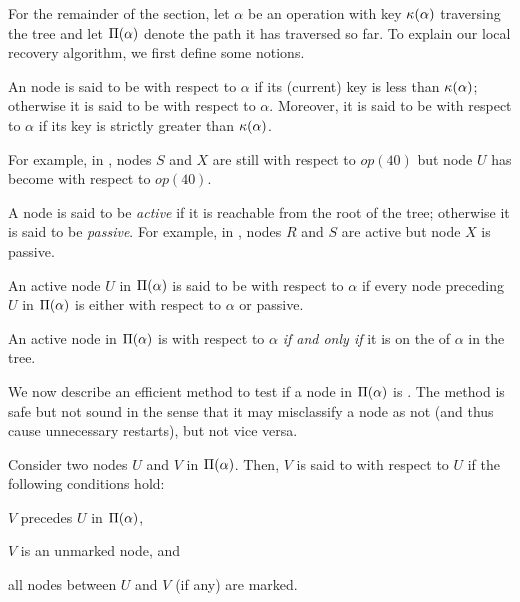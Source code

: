 For the remainder of the section, let $\alpha$ be an operation with key 
$\kappa(\alpha)$ traversing the tree and let $\Pi(\alpha)$ denote the 
path it has traversed so far. To explain our local recovery algorithm, we first define some notions.

\begin{definition}
An \myanchor{} node is said to be \emph{\myconsistent} with respect to $\alpha$ 
if its (current) key is less than $\kappa(\alpha)$; otherwise it is said to be \emph{\mynonconsistent} with respect to $\alpha$.
Moreover, it is said to be \emph{\myinconsistent} with respect to $\alpha$
if its key is strictly greater than $\kappa(\alpha)$.
\end{definition}


For example, in , \myanchor{} 
nodes $S$ and $X$ are still \myconsistent{} with respect to $op(40)$ but 
node $U$ has become \mynonconsistent{} with respect to $op(40)$. 


A node is said to be \emph{active} if it is reachable from the root of the tree; otherwise it is said to be \emph{passive}.
For example, in , nodes $R$ and $S$ are active but node $X$ is passive.

\begin{definition}
\label{def:legal}
An active node $U$ in $\Pi(\alpha)$ is said to be \emph{\mylegal} with respect to $\alpha$ 
if every \myanchor{} node preceding $U$ in $\Pi(\alpha)$ is  
either \myconsistent{} with respect to $\alpha$ or passive.
\end{definition}

\begin{lemma}
\label{lem:legal:accesspath}
An active node in $\Pi(\alpha)$ is \mylegal{} with respect to $\alpha$ \emph{if and only if} it is on the \accesspath of 
$\alpha$ in the tree.
\end{lemma}

We now describe an efficient method to test if a node in $\Pi(\alpha)$ is \mylegal{}. The method is safe but not sound in the sense that it may misclassify a \mylegal{} node as not \mylegal{} (and thus cause unnecessary restarts), but not vice versa. 


\begin{definition}
\label{def:critical}
Consider two nodes $U$ and $V$ in $\Pi(\alpha)$. Then,  
$V$ is said to \emph{\mycritical} with respect to $U$ if the following conditions hold:
\begin{enumerate*}[label=(\roman*)]
\item $V$ precedes $U$ in $\Pi(\alpha)$,
\item $V$ is an unmarked \myanchor{} node, and 
\item all \myanchor{} nodes between $U$ and $V$ (if any) are marked.
\end{enumerate*}
\end{definition}

